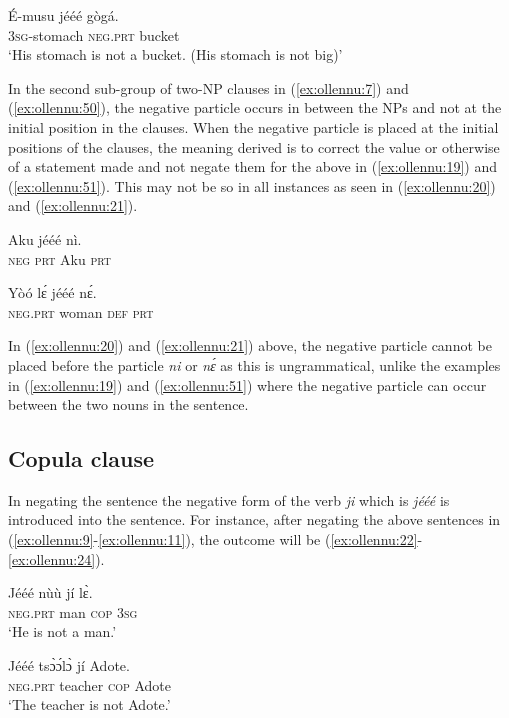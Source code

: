 \documentclass[output=paper,newtxmath,modfonts,nonflat,hidelinks]{langsci/langscibook}
\begin{document}
\ea \label{ex:ollennu:51}
\gll É-musu jééé gògá.\\
3\textsc{sg}-stomach \textsc{neg}.\textsc{prt} bucket\\
\glt 	`His stomach is not a bucket. (His stomach is not big)'
\z


In the second sub-group of two-NP clauses in (\ref{ex:ollennu:7}) and (\ref{ex:ollennu:50}), the {negative particle} occurs in between the NPs and not at the initial position in the clauses. When the {negative particle} is placed at the initial positions of the clauses, the meaning derived is to correct the value or otherwise of a statement made and not negate them for the above in (\ref{ex:ollennu:19}) and (\ref{ex:ollennu:51}). This may not be so in all instances as seen in (\ref{ex:ollennu:20}) and (\ref{ex:ollennu:21}).

\ea \label{ex:ollennu:20}
\gll * Aku jééé nì. \\
{} \textsc{neg} \textsc{prt} Aku \textsc{prt}\\
\z

\ea \label{ex:ollennu:21}
\gll * Yòó l\'ɛ jééé n\'ɛ.\\
{} \textsc{neg}.\textsc{prt} woman \textsc{def} \textsc{prt}\\
\z


In (\ref{ex:ollennu:20}) and (\ref{ex:ollennu:21}) above, the {negative particle} cannot be placed before the particle \textit{ni} or \textit{n\'ɛ} as this is ungrammatical, unlike the examples in (\ref{ex:ollennu:19}) and (\ref{ex:ollennu:51}) where the {negative particle} can occur between the two nouns in the sentence.

\subsection{\label{sec:ollennu:2.2} Copula clause}

In negating the  sentence the negative form of the  verb \textit{ji} which is \textit{jééé} is introduced into the sentence. For instance, after negating the above  sentences in (\ref{ex:ollennu:9}-\ref{ex:ollennu:11}), the outcome will be (\ref{ex:ollennu:22}-\ref{ex:ollennu:24}).

\ea \label{ex:ollennu:22}
\gll Jééé nùù jí l\`ɛ.\\
\textsc{neg}.\textsc{prt} man \textsc{cop} 3\textsc{sg}\\
\glt `He is not a man.'
\z

\ea \label{ex:ollennu:23}
\gll Jééé ts\`ɔ\'ɔl\`ɔ jí Adote.\\
\textsc{neg}.\textsc{prt} teacher \textsc{cop} Adote\\
\glt `The teacher is not Adote.'
\z
\end{document}
